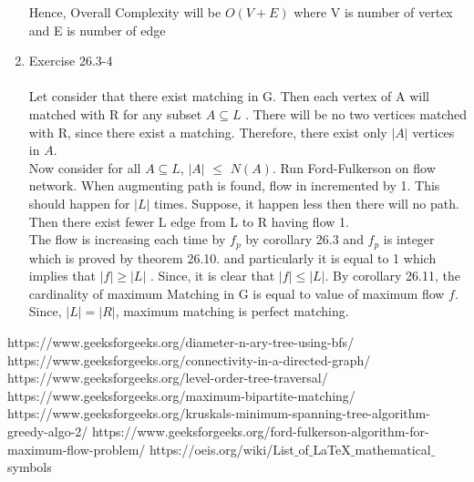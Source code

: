 \documentclass{article}
\begin{document}
\begin{enumerate}
    Hence, Overall Complexity will  be $O(V+E)$ where V is number of vertex and E is number of edge 
    \item Exercise 26.3-4\\ \\
    Let consider that there exist matching in G. Then each vertex of A will matched with R for any subset  $A \subseteq L$  . There will be no two vertices matched with R, since there exist a matching. Therefore, there exist only $|A|$ vertices in $A$.\\
    
    Now consider for all $A \subseteq L$,  $|A|$ $\leq$ $N(A)$. Run Ford-Fulkerson on flow network. When augmenting path is found, flow in incremented by 1. This should happen for $|L|$ times. Suppose, it happen less then there will no path. Then there exist fewer  L edge from L to R having flow 1.  \\
    
    The flow is increasing each time by $f_{p}$ by corollary 26.3 and $f_{p}$ is integer which is proved by theorem 26.10. and particularly it is equal to 1 which implies that $|f| \geq |L|$ . Since, it is clear that $|f| \leq |L|$. By corollary 26.11, the cardinality of maximum Matching in G is equal to value of  maximum flow $f$. Since, $|L| = |R|$, maximum matching is perfect matching.         
    
\end{enumerate}
\begin{thebibliography}{9}
https://www.geeksforgeeks.org/diameter-n-ary-tree-using-bfs/
https://www.geeksforgeeks.org/connectivity-in-a-directed-graph/
https://www.geeksforgeeks.org/level-order-tree-traversal/
https://www.geeksforgeeks.org/maximum-bipartite-matching/
https://www.geeksforgeeks.org/kruskals-minimum-spanning-tree-algorithm-greedy-algo-2/
https://www.geeksforgeeks.org/ford-fulkerson-algorithm-for-maximum-flow-problem/
https://oeis.org/wiki/List$\_$of$\_$LaTeX$\_$mathematical$\_$symbols
\end{thebibliography}
\end{document}
